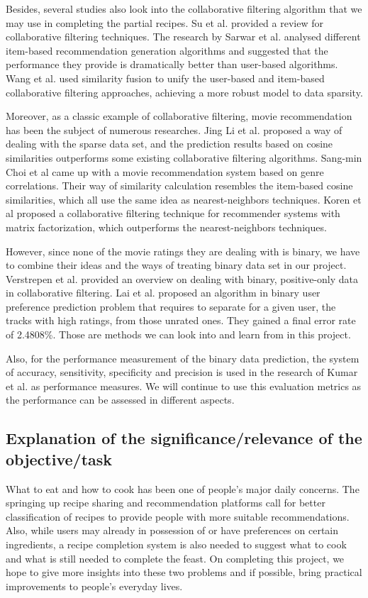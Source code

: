 \documentclass{article}
\begin{document}
Besides, several studies also look into the collaborative filtering algorithm that we may use in completing the partial recipes. Su et al.
\cite{su2009survey}
provided a review for collaborative filtering techniques. The research by Sarwar et al.
\cite{sarwar2001item}
analysed different item-based recommendation generation algorithms and suggested that the performance they provide is dramatically better than user-based algorithms. Wang et al.
\cite{wang2006unifying}
used similarity fusion to unify the user-based and item-based collaborative filtering approaches, achieving a more robust model to data sparsity.

Moreover, as a classic example of collaborative filtering, movie recommendation has been the subject of numerous researches. Jing Li et al.
\cite{bridge}
proposed a way of dealing with the sparse data set, and the prediction results based on cosine similarities outperforms some existing collaborative filtering algorithms. Sang-min Choi et al
\cite{genre}
came up with a movie recommendation system based on genre correlations. Their way of similarity calculation resembles the item-based cosine similarities, which all use the same idea as nearest-neighbors techniques. Koren et al
\cite{Koren2009}
proposed a collaborative filtering technique for recommender systems with matrix factorization, which outperforms the nearest-neighbors techniques.

However, since none of the movie ratings they are dealing with is binary, we have to combine their ideas and the ways of treating binary data set in our project. Verstrepen et al.
\cite{cf_method1}
provided an overview on dealing with binary, positive-only data in collaborative filtering. Lai et al.
\cite{cf_method2}
proposed an algorithm in binary user preference prediction problem that requires to separate for a given user, the tracks with high ratings, from those unrated ones. They gained a final error rate of 2.4808\%. Those are methods we can look into and learn from in this project.

Also, for the performance measurement of the binary data prediction, the system of accuracy, sensitivity, specificity and precision is used in the research of Kumar et al.
\cite{metrics}
as performance measures. We will continue to use this evaluation metrics as the performance can be assessed in different aspects. 

\subsection{Explanation of the significance/relevance of the objective/task}
What to eat and how to cook has been one of people's major daily concerns. The springing up recipe sharing and recommendation platforms call for better classification of recipes to provide people with more suitable recommendations. Also, while users may already in possession of or have preferences on certain ingredients, a recipe completion system is also needed to suggest what to cook and what is still needed to complete the feast. On completing this project, we hope to give more insights into these two problems and if possible, bring practical improvements to people's everyday lives.
\end{document}
